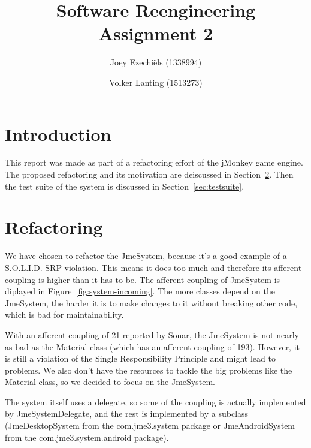 \documentclass[a4paper, 10pt]{article}
\title{Software Reengineering\\
       Assignment 2}
\author{Joey Ezechi\"{e}ls (1338994) \and Volker Lanting (1513273)}
\begin{document}
\maketitle %

\newpage
\tableofcontents %


\newpage
{}
\section{Introduction}
This report was made as part of a refactoring effort of the jMonkey game engine.
The proposed refactoring and its motivation are deiscussed in Section~\ref{sec:refactoring}.
Then the test suite of the system is discussed in Section~\ref{sec:testsuite}.

\section{Refactoring}
\label{sec:refactoring}
We have chosen to refactor the JmeSystem, 
because it's a good example of a S.O.L.I.D. SRP violation.
This means it does too much and therefore its afferent coupling is higher than it has to be.
The afferent coupling of JmeSystem is diplayed in Figure~\ref{fig:system-incoming}.
The more classes depend on the JmeSystem, the harder it is to make changes to it without breaking other code,
which is bad for maintainability.

	With an afferent coupling of 21 reported by Sonar, 
	the JmeSystem is not nearly as bad as the Material class (which has an afferent coupling of 193).
	However, it is still a violation of the Single Responsibility Principle and might lead to problems.
	We also don't have the resources to tackle the big problems like the Material class,
	so we decided to focus on the JmeSystem.

	The system itself uses a delegate, so some of the coupling is actually implemented by JmeSystemDelegate,
	and the rest is implemented by a subclass (JmeDesktopSystem from the com.jme3.system package or JmeAndroidSystem from the com.jme3.system.android package).
\end{document}
